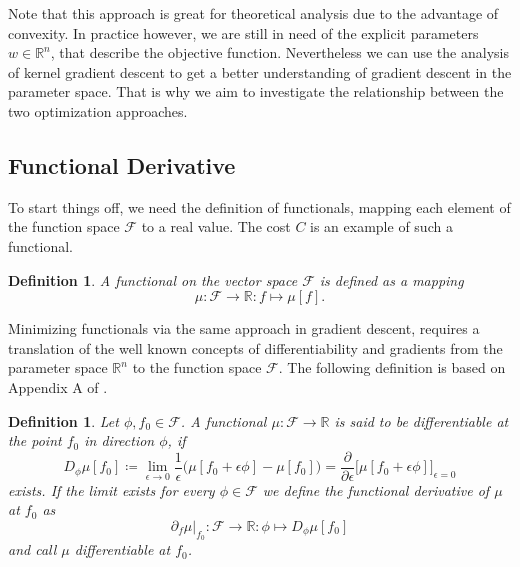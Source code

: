 \documentclass[11pt, a4paper]{article}
\newtheorem{definition}[theorem]{Definition}
\newcommand{\R}{\mathbb{R}}
\newcommand{\F}{\mathcal{F}}
\begin{document}
Note that this approach is great for theoretical analysis due to the advantage of convexity. In practice however, we are still in need of the explicit parameters $w \in \R^n$, that describe the objective function. Nevertheless we can use the analysis of kernel gradient descent to get a better understanding of gradient descent in the parameter space. That is why we aim to investigate the relationship between the two optimization approaches.


\subsection{Functional Derivative}

To start things off, we need the definition of functionals, mapping each element of the function space $\F$ to a real value. The cost $C$ is an example of such a functional.

\begin{definition}
A functional on the vector space $\F$ is defined as a mapping
\[ \mu: \F \to \R : f \mapsto \mu[f]. \]
\end{definition}

Minimizing functionals via the same approach in gradient descent, requires a translation of the well known concepts of differentiability and gradients from the parameter space $\R^n$ to the function space $\F$. The following definition is based on Appendix A of \cite{Functionals}.

\begin{definition}
Let $\phi, f_0 \in \F$. A functional $\mu : \F \to \R$ is said to be differentiable at the point $f_0$ in direction $\phi$, if
\[ D_\phi\mu[f_0] \coloneq \lim_{\epsilon \to 0} \frac{1}{\epsilon} \Big ( \mu[f_0 + \epsilon \phi] - \mu[f_0] \Big ) = \frac{\partial}{\partial \epsilon} \Big [ \mu[f_0+\epsilon \phi] \Big ]_{\epsilon=0} \]
exists. If the limit exists for every $\phi \in \F$ we define the functional derivative of $\mu$ at $f_0$ as
\[ \partial_{f} \mu |_{f_0} : \F \to \R : \phi \mapsto D_\phi\mu[f_0] \]
and call $\mu$ differentiable at $f_0$.
\end{definition}
\end{document}
